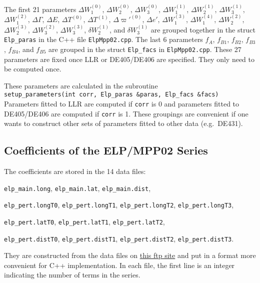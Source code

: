 \documentclass[12pt]{article}
\begin{document}
The first 21 parameters $\Delta W_1^{(0)}$, $\Delta W_2^{(0)}$, $\Delta W_3^{(0)}$, 
$\Delta W_1^{(1)}$, $\Delta W_2^{(1)}$, $\Delta W_3^{(1)}$, $\Delta W_1^{(2)}$, 
$\Delta \Gamma$, $\Delta E$, $\Delta T^{(0)}$, $\Delta T^{(1)}$, $\Delta \varpi'^{(0)}$, 
$\Delta e'$, $\Delta W_1^{(3)}$, $\Delta W_1^{(4)}$, $\Delta W_2^{(2)}$, 
$\Delta W_2^{(3)}$, $\Delta W_3^{(2)}$, $\Delta W_3^{(3)}$, $\delta W_2^{(1)}$, 
and $\delta W_3^{(1)}$ are grouped together in the struct {\tt Elp\_paras} 
in the C++ file {\tt ElpMpp02.cpp}. The last 6 parameters $f_A$, $f_{B1}$, $f_{B2}$, 
$f_{B3}$, $f_{B4}$, and $f_{B5}$ are grouped in the struct {\tt Elp\_facs} 
in {\tt ElpMpp02.cpp}. These 27 parameters are fixed once LLR or DE405/DE406 are 
specified. They only need to be computed once. 

These parameters are calculated in the subroutine \\
{\tt setup\_parameters(int corr, Elp\_paras \&paras, Elp\_facs \&facs)} \\
Parameters fitted to LLR are computed if {\tt corr} is 0 and parameters
fitted to DE405/DE406 are computed if {\tt corr} is 1. These groupings are 
convenient if one wants to construct other sets of parameters fitted to 
other data (e.g.\ DE431).

\subsection{Coefficients of the ELP/MPP02 Series}
\label{sec:ElpCoefs}

The coefficients are stored in the 14 data files: 

{\tt elp\_main.long}, {\tt elp\_main.lat}, {\tt elp\_main.dist}, 

{\tt elp\_pert.longT0}, {\tt elp\_pert.longT1}, {\tt elp\_pert.longT2}, 
{\tt elp\_pert.longT3},

{\tt elp\_pert.latT0}, {\tt elp\_pert.latT1}, {\tt elp\_pert.latT2}, 

{\tt elp\_pert.distT0}, {\tt elp\_pert.distT1}, {\tt elp\_pert.distT2}, 
{\tt elp\_pert.distT3}. 

They are 
constructed from the data files on 
\href{ftp://cyrano-se.obspm.fr/pub/2_lunar_solutions/2_elpmpp02/}{this ftp site} 
and put in a format more convenient for C++ implementation. 
In each file, the 
first line is an integer indicating the number of terms in the series. 
\end{document}
